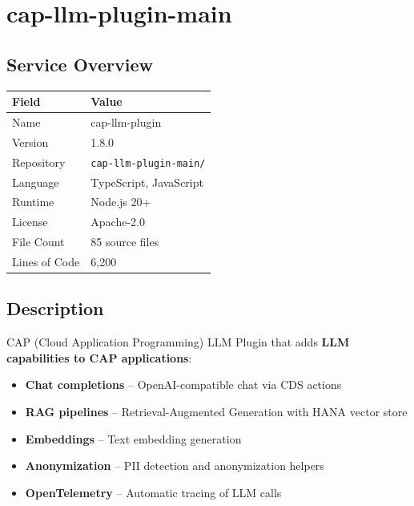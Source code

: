 \documentclass[11pt,a4paper]{article}
\begin{document}
\newpage

\section{cap-llm-plugin-main}

\subsection{Service Overview}

\begin{tabular}{@{}L{4cm}L{10cm}@{}}
\toprule
\textbf{Field} & \textbf{Value} \\
\midrule
Name & cap-llm-plugin \\
Version & 1.8.0 \\
Repository & \texttt{cap-llm-plugin-main/} \\
Language & TypeScript, JavaScript \\
Runtime & Node.js 20+ \\
License & Apache-2.0 \\
File Count & 85 source files \\
Lines of Code & 6,200 \\
\bottomrule
\end{tabular}

\subsection{Description}

CAP (Cloud Application Programming) LLM Plugin that adds \textbf{LLM capabilities to CAP applications}:

\begin{itemize}[noitemsep]
    \item \textbf{Chat completions} -- OpenAI-compatible chat via CDS actions
    \item \textbf{RAG pipelines} -- Retrieval-Augmented Generation with HANA vector store
    \item \textbf{Embeddings} -- Text embedding generation
    \item \textbf{Anonymization} -- PII detection and anonymization helpers
    \item \textbf{OpenTelemetry} -- Automatic tracing of LLM calls
\end{itemize}
\end{document}
